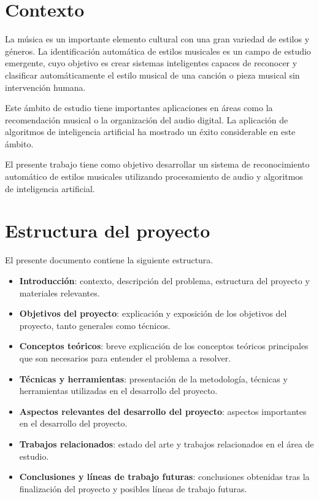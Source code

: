 
\section{Contexto}

La música es un importante elemento cultural con una gran variedad de estilos y géneros.
La identificación automática de estilos musicales es un campo de estudio emergente, cuyo objetivo es crear sistemas inteligentes capaces de reconocer y clasificar automáticamente el estilo musical de una canción o pieza musical sin intervención humana. 

Este ámbito de estudio tiene importantes aplicaciones en áreas como la recomendación musical \cite{https://doi.org/10.1049/el.2019.4202} o la organización del audio digital.
La aplicación de algoritmos de inteligencia artificial ha mostrado un éxito considerable en este ámbito.

El presente trabajo tiene como objetivo desarrollar un sistema de reconocimiento automático de estilos musicales utilizando procesamiento de audio y algoritmos de inteligencia artificial.

\section{Estructura del proyecto}
El presente documento contiene la siguiente estructura.

\begin{itemize}
\tightlist
\item \textbf{Introducción}: contexto, descripción del problema, estructura del proyecto y materiales relevantes.
\item \textbf{Objetivos del proyecto}: explicación y exposición de los objetivos del proyecto, tanto generales como técnicos.
\item \textbf{Conceptos teóricos}: breve explicación de los conceptos teóricos principales que son necesarios para entender el problema a resolver.
\item \textbf{Técnicas y herramientas}: presentación de la metodología, técnicas y herramientas utilizadas en el desarrollo del proyecto.
\item \textbf{Aspectos relevantes del desarrollo del proyecto}: aspectos importantes en el desarrollo del proyecto.
\item \textbf{Trabajos relacionados}: estado del arte y trabajos relacionados en el área de estudio.
\item \textbf{Conclusiones y líneas de trabajo futuras}: conclusiones obtenidas tras la finalización del proyecto y posibles líneas de trabajo futuras.
\end{itemize}

